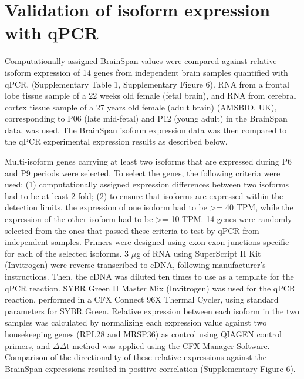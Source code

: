 \documentclass[12pt,chapterheads,final]{ucsd}
\begin{document}
\section{Validation of isoform expression with qPCR}
Computationally assigned BrainSpan values were compared against relative isoform expression of 14 genes from independent brain samples quantified with qPCR. (Supplementary Table 1, Supplementary Figure 6). RNA from a frontal lobe tissue sample of a 22 weeks old female (fetal brain), and RNA from cerebral cortex tissue sample of a 27 years old female (adult brain) (AMSBIO, UK), corresponding to P06 (late mid-fetal) and P12 (young adult) in the BrainSpan data, was used. The BrainSpan isoform expression data was then compared to the qPCR experimental expression results as described below. \par
Multi-isoform genes carrying at least two isoforms that are expressed during P6 and P9 periods were selected. To select the genes, the following criteria were used: (1) computationally assigned expression differences between two isoforms had to be at least 2-fold; (2) to ensure that isoforms are expressed within the detection limits, the expression of one isoform had to be >= 40 TPM, while the expression of the other isoform had to be >= 10 TPM. 14 genes were randomly selected from the ones that passed these criteria to test by qPCR from independent samples. Primers were designed using exon-exon junctions specific for each of the selected isoforms.  3 $\mu$g of RNA using SuperScript II Kit (Invitrogen) were reverse transcribed to cDNA, following manufacturer’s instructions. Then, the cDNA was diluted ten times to use as a template for the qPCR reaction. SYBR Green II Master Mix (Invitrogen) was used for the qPCR reaction, performed in a CFX Connect 96X Thermal Cycler, using standard parameters for SYBR Green. Relative expression between each isoform in the two samples was calculated by normalizing each expression value against two housekeeping genes (RPL28 and MRSP36) as control using QIAGEN control primers, and $\Delta\Delta$t method was applied using the CFX Manager Software. Comparison of the directionality of these relative expressions against the BrainSpan expressions resulted in positive correlation (Supplementary Figure 6).
\end{document}
